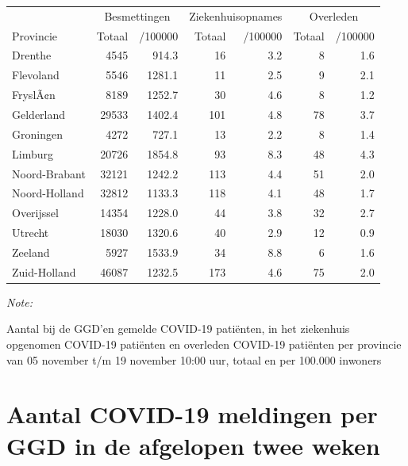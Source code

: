 \documentclass[
  english,
  man,floatsintext]{apa6}
\begin{document}
\begin{table}
\centering
\begin{threeparttable}
\begin{tabular}{lrrrrrr}
\toprule
\multicolumn{1}{c}{ } & \multicolumn{2}{c}{Besmettingen} & \multicolumn{2}{c}{Ziekenhuisopnames} & \multicolumn{2}{c}{Overleden} \\
\cmidrule(l{3pt}r{3pt}){2-3} \cmidrule(l{3pt}r{3pt}){4-5} \cmidrule(l{3pt}r{3pt}){6-7}
Provincie & Totaal & /100000 & Totaal & /100000 & Totaal & /100000\\
\midrule
Drenthe & 4545 & 914.3 & 16 & 3.2 & 8 & 1.6\\
Flevoland & 5546 & 1281.1 & 11 & 2.5 & 9 & 2.1\\
FryslÃ¢n & 8189 & 1252.7 & 30 & 4.6 & 8 & 1.2\\
Gelderland & 29533 & 1402.4 & 101 & 4.8 & 78 & 3.7\\
Groningen & 4272 & 727.1 & 13 & 2.2 & 8 & 1.4\\
Limburg & 20726 & 1854.8 & 93 & 8.3 & 48 & 4.3\\
Noord-Brabant & 32121 & 1242.2 & 113 & 4.4 & 51 & 2.0\\
Noord-Holland & 32812 & 1133.3 & 118 & 4.1 & 48 & 1.7\\
Overijssel & 14354 & 1228.0 & 44 & 3.8 & 32 & 2.7\\
Utrecht & 18030 & 1320.6 & 40 & 2.9 & 12 & 0.9\\
Zeeland & 5927 & 1533.9 & 34 & 8.8 & 6 & 1.6\\
Zuid-Holland & 46087 & 1232.5 & 173 & 4.6 & 75 & 2.0\\
\bottomrule
\end{tabular}
\begin{tablenotes}
\item \textit{Note: } 
\item Aantal bij de GGD’en gemelde COVID-19 patiënten, in het ziekenhuis opgenomen COVID-19 patiënten en overleden COVID-19 patiënten per provincie van 05 november t/m 19 november 10:00 uur, totaal en per 100.000 inwoners
\end{tablenotes}
\end{threeparttable}
\end{table}

\newpage

\hypertarget{aantal-covid-19-meldingen-per-ggd-in-de-afgelopen-twee-weken}{%
\section{Aantal COVID-19 meldingen per GGD in de afgelopen twee weken}\label{aantal-covid-19-meldingen-per-ggd-in-de-afgelopen-twee-weken}}
\end{document}
